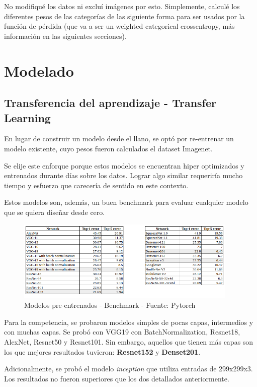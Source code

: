 \documentclass{article}[9pt]
\begin{document}
No modifiqué los datos ni excluí imágenes por esto. Simplemente, calculé los diferentes pesos de las categorías de las siguiente forma para ser usados por la función de pérdida (que va a ser un weighted categorical crossentropy, más información en las siguientes secciones).
 

\section{Modelado}
\label{sec:headings}

\subsection{Transferencia del aprendizaje - Transfer Learning}

En lugar de construir un modelo desde el llano, se optó por re-entrenar un modelo existente, cuyo pesos fueron calculados el dataset Imagenet.

Se elije este enforque porque estos modelos se encuentran hiper optimizados y entrenados durante días sobre los datos. Lograr algo similar requeriría mucho tiempo y esfuerzo que carecería de sentido en este contexto. 

Estos modelos son, además, un buen benchmark para evaluar cualquier modelo que se quiera diseñar desde cero. 
\begin{figure}[H]
\centering
    \includegraphics[width=400px]{img/pytorch-benchmark.png}
    \caption{Modelos pre-entrenados - Benchmark - Fuente: Pytorch}
    \label{models_bench}
\end{figure}
Para la competencia, se probaron modelos simples de pocas capas, intermedios y con muchas capas. Se probó con VGG19 con BatchNormalization, Resnet18, AlexNet, Resnet50 y Resnet101. Sin embargo, aquellos que tienen más capas son los que mejores resultados tuvieron: \textbf{Resnet152} y \textbf{Denset201}. 

Adicionalmente, se probó el modelo \textit{inception} que utiliza entradas de 299x299x3. Los resultados no fueron superiores que los dos detallados anteriormente.
\end{document}

